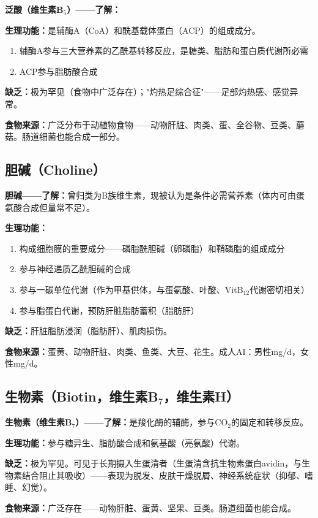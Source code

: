 \begin{tipbox}
\textbf{泛酸（维生素B$_5$）——了解：}

\textbf{生理功能：}是辅酶A（CoA）和酰基载体蛋白（ACP）的组成成分。
\begin{enumerate}[leftmargin=*]
    \item 辅酶A参与三大营养素的乙酰基转移反应，是糖类、脂肪和蛋白质代谢所必需
    \item ACP参与脂肪酸合成
\end{enumerate}

\textbf{缺乏：}极为罕见（食物中广泛存在）；"灼热足综合征"——足部灼热感、感觉异常。

\textbf{食物来源：}广泛分布于动植物食物——动物肝脏、肉类、蛋、全谷物、豆类、蘑菇。肠道细菌也能合成一部分。
\end{tipbox}

\subsection{胆碱（Choline）}

\begin{tipbox}
\textbf{胆碱——了解：}曾归类为B族维生素，现被认为是条件必需营养素（体内可由蛋氨酸合成但量常不足）。

\textbf{生理功能：}
\begin{enumerate}[leftmargin=*]
    \item 构成细胞膜的重要成分——磷脂酰胆碱（卵磷脂）和鞘磷脂的组成成分
    \item 参与神经递质乙酰胆碱的合成
    \item 参与一碳单位代谢（作为甲基供体，与蛋氨酸、叶酸、VitB$_{12}$代谢密切相关）
    \item 参与脂蛋白代谢，预防肝脏脂肪蓄积（脂肪肝）
\end{enumerate}

\textbf{缺乏：}肝脏脂肪浸润（脂肪肝）、肌肉损伤。

\textbf{食物来源：}蛋黄、动物肝脏、肉类、鱼类、大豆、花生。成人AI：男性mg/d，女性mg/d。
\end{tipbox}

\subsection{生物素（Biotin，维生素B$_7$，维生素H）}

\begin{tipbox}
\textbf{生物素（维生素B$_7$）——了解：}是羧化酶的辅酶，参与CO$_2$的固定和转移反应。

\textbf{生理功能：}参与糖异生、脂肪酸合成和氨基酸（亮氨酸）代谢。

\textbf{缺乏：}极为罕见。可见于长期摄入生蛋清者（生蛋清含抗生物素蛋白avidin，与生物素结合阻止其吸收）——表现为脱发、皮肤干燥脱屑、神经系统症状（抑郁、嗜睡、幻觉）。

\textbf{食物来源：}广泛存在——动物肝脏、蛋黄、坚果、豆类。肠道细菌也能合成。
\end{tipbox}

